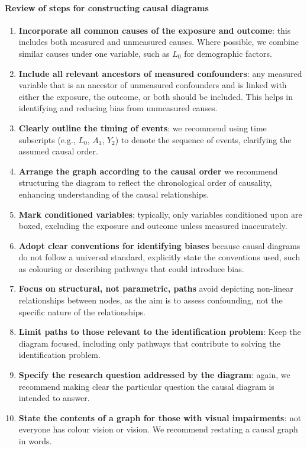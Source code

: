 \documentclass[
  singlecolumn]{article}
\let\oldparagraph\paragraph
\renewcommand{\paragraph}[1]{\oldparagraph{#1}\mbox{}}
\begin{document}
\paragraph{Review of steps for constructing causal
diagrams}\label{review-of-steps-for-constructing-causal-diagrams}

\begin{enumerate}
\def\labelenumi{\arabic{enumi}.}
\item
  \textbf{Incorporate all common causes of the exposure and outcome}:
  this includes both measured and unmeasured causes. Where possible, we
  combine similar causes under one variable, such as \(L_0\) for
  demographic factors.
\item
  \textbf{Include all relevant ancestors of measured confounders}: any
  measured variable that is an ancestor of unmeasured confounders and is
  linked with either the exposure, the outcome, or both should be
  included. This helps in identifying and reducing bias from unmeasured
  causes.
\item
  \textbf{Clearly outline the timing of events}: we recommend using time
  subscripts (e.g., \(L_0\), \(A_1\), \(Y_2\)) to denote the sequence of
  events, clarifying the assumed causal order.
\item
  \textbf{Arrange the graph according to the causal order} we recommend
  structuring the diagram to reflect the chronological order of
  causality, enhancing understanding of the causal relationships.
\item
  \textbf{Mark conditioned variables}: typically, only variables
  conditioned upon are boxed, excluding the exposure and outcome unless
  measured inaccurately.
\item
  \textbf{Adopt clear conventions for identifying biases} because causal
  diagrams do not follow a universal standard, explicitly state the
  conventions used, such as colouring or describing pathways that could
  introduce bias.
\item
  \textbf{Focus on structural, not parametric, paths} avoid depicting
  non-linear relationships between nodes, as the aim is to assess
  confounding, not the specific nature of the relationships.
\item
  \textbf{Limit paths to those relevant to the identification problem}:
  Keep the diagram focused, including only pathways that contribute to
  solving the identification problem.
\item
  \textbf{Specify the research question addressed by the diagram}:
  again, we recommend making clear the particular question the causal
  diagram is intended to answer.
\item
  \textbf{State the contents of a graph for those with visual
  impairments}: not everyone has colour vision or vision. We recommend
  restating a causal graph in words.
\end{enumerate}
\end{document}
